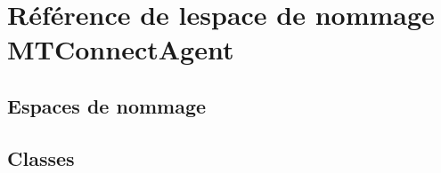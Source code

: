 \hypertarget{namespace_m_t_connect_agent}{}\section{Référence de l\textquotesingle{}espace de nommage M\+T\+Connect\+Agent}
\label{namespace_m_t_connect_agent}
\subsection*{Espaces de nommage}
\begin{DoxyCompactItemize}
\end{DoxyCompactItemize}
\subsection*{Classes}
